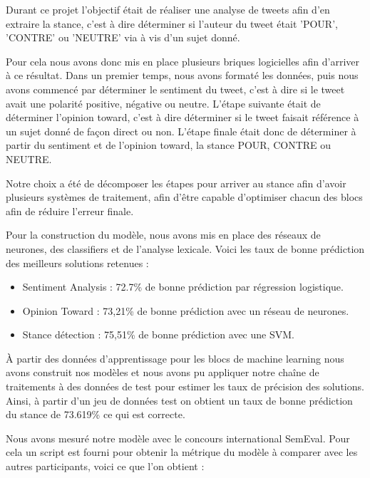 \par Durant ce projet l'objectif était de réaliser une analyse de tweets afin d'en extraire la stance, c'est à dire déterminer si l'auteur du tweet était 'POUR', 'CONTRE' ou 'NEUTRE' via à vis d'un sujet donné. 

\par Pour cela nous avons donc mis en place plusieurs briques logicielles afin d'arriver à ce résultat. Dans un premier temps, nous avons formaté les données, puis nous avons commencé par déterminer le sentiment du tweet, c'est à dire si le tweet avait une polarité positive, négative ou neutre. L'étape suivante était de déterminer l'opinion toward, c'est à dire déterminer si le tweet faisait référence à un sujet donné de façon direct ou non. L'étape finale était donc de déterminer à partir du sentiment et de l'opinion toward, la stance POUR, CONTRE ou NEUTRE. \\

\par Notre choix a été de décomposer les étapes pour arriver au stance afin d'avoir plusieurs systèmes de traitement, afin d'être capable d'optimiser chacun des blocs afin de réduire l'erreur finale.  

\par Pour la construction du modèle, nous avons mis en place des réseaux de neurones, des classifiers et de l'analyse lexicale. Voici les taux de bonne prédiction des meilleurs solutions retenues : \\
\begin{itemize}
	\item Sentiment Analysis : 72.7\% de bonne prédiction par régression logistique.
	\item Opinion Toward : 73,21\%  de bonne prédiction avec un réseau de neurones.
	\item Stance détection : 75,51\% de bonne prédiction avec une SVM. \\
\end{itemize}

\par À partir des données d'apprentissage pour les blocs de machine learning nous avons construit nos modèles et nous avons pu appliquer notre chaîne de traitements à des données de test pour estimer les taux de précision des solutions. Ainsi, à partir d'un jeu de données test on obtient un taux de bonne prédiction du stance de 73.619\% ce qui est correcte. 

\par Nous avons mesuré notre modèle avec le concours international SemEval. Pour cela un script est fourni pour obtenir la métrique du modèle à comparer avec les autres participants, voici ce que l'on obtient : \\


